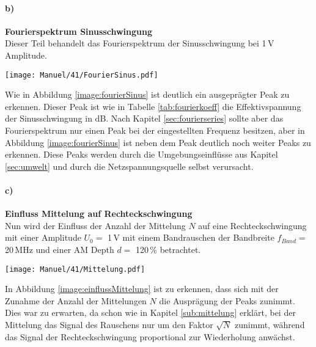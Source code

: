 \paragraph{b)}\textbf{Fourierspektrum Sinusschwingung}\\
Dieser Teil behandelt das Fourierspektrum der Sinusschwingung bei 1\,V Amplitude.
\begin{center}
    \texttt{[image: Manuel/41/FourierSinus.pdf]}
    \label{image:fourierSinus}
\end{center}
Wie in Abbildung \ref{image:fourierSinus} ist deutlich ein ausgeprägter Peak zu erkennen. Dieser Peak ist wie in Tabelle \ref{tab:fourierkoeff} die Effektivspannung der Sinusschwingung in dB. Nach Kapitel \ref{sec:fourierseries} sollte aber das Fourierspektrum nur einen Peak bei der eingestellten Frequenz besitzen, aber in Abbildung \ref{image:fourierSinus} ist neben dem Peak deutlich noch weiter Peaks zu erkennen. Diese Peaks werden durch die Umgebungseinflüsse aus Kapitel \ref{sec:umwelt} und durch die Netzspannungsquelle selbst verursacht.
\newpage
\paragraph{c)}\textbf{Einfluss Mittelung auf Rechteckschwingung}\\
Nun wird der Einfluss der Anzahl der Mittelung $N$ auf eine Rechteckschwingung mit einer Amplitude $U_0=$ 1\,V mit einem Bandrauschen der Bandbreite $f_{Band}=$ 20\,MHz und einer AM Depth $d =$ 120\,\% betrachtet.
\begin{center}
    \texttt{[image: Manuel/41/Mittelung.pdf]}
    \label{image:einflussMittelung}
\end{center}
In Abbildung \ref{image:einflussMittelung} ist zu erkennen, dass sich mit der Zunahme der Anzahl der Mittelungen $N$ die Ausprägung der Peaks zunimmt. Dies war zu erwarten, da schon wie in Kapitel \ref{sub:mittelung} erklärt, bei der Mittelung das Signal des Rauschens nur um den Faktor $\sqrt{N}$ zunimmt, während das Signal der Rechteckschwingung proportional zur Wiederholung anwächst.
\newpage
